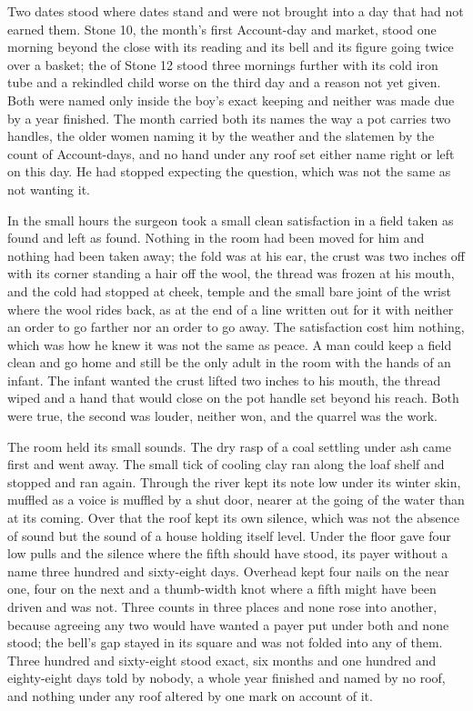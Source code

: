 Two dates stood where dates stand and were not brought into a day that had not earned them. Stone 10, the month's first Account-day and market, stood one morning beyond the close with its reading and its bell and its figure going twice over a basket; the  of Stone 12 stood three mornings further with its cold iron tube and a rekindled child worse on the third day and a reason not yet given. Both were named only inside the boy's exact keeping and neither was made due by a year finished. The month carried both its names the way a pot carries two handles, the older women naming it by the weather and the slatemen by the count of Account-days, and no hand under any roof set either name right or left on this day. He had stopped expecting the question, which was not the same as not wanting it.

\scenebreak

In the small hours the surgeon took a small clean satisfaction in a field taken as found and left as found. Nothing in the room had been moved for him and nothing had been taken away; the fold was at his ear, the crust was two inches off with its corner standing a hair off the wool, the thread was frozen at his mouth, and the cold had stopped at cheek, temple and the small bare joint of the wrist where the wool rides back, as at the end of a line written out for it with neither an order to go farther nor an order to go away. The satisfaction cost him nothing, which was how he knew it was not the same as peace. A man could keep a field clean and go home and still be the only adult in the room with the hands of an infant. The infant wanted the crust lifted two inches to his mouth, the thread wiped and a hand that would close on the pot handle set beyond his reach. Both were true, the second was louder, neither won, and the quarrel was the work.

The room held its small sounds. The dry rasp of a coal settling under ash came first and went away. The small tick of cooling clay ran along the loaf shelf and stopped and ran again. Through  the river kept its note low under its winter skin, muffled as a voice is muffled by a shut door, nearer at the going of the water than at its coming. Over that the roof kept its own silence, which was not the absence of sound but the sound of a house holding itself level. Under the floor  gave four low pulls and the silence where the fifth should have stood, its payer without a name three hundred and sixty-eight days. Overhead  kept four nails on the near one, four on the next and a thumb-width knot where a fifth might have been driven and was not. Three counts in three places and none rose into another, because agreeing any two would have wanted a payer put under both and none stood; the bell's gap stayed in its square and was not folded into any of them. Three hundred and sixty-eight stood exact, six months and one hundred and eighty-eight days told by nobody, a whole year finished and named by no roof, and nothing under any roof altered by one mark on account of it.

